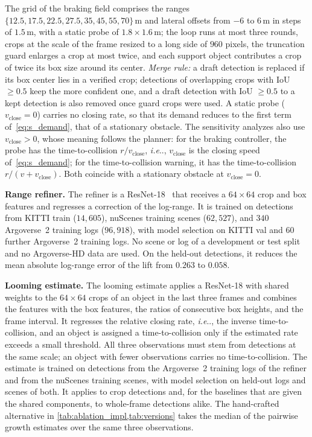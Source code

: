 \documentclass[10pt,letterpaper]{article}
\makeatletter
\DeclareRobustCommand\onedot{\futurelet\@let@token\@onedot}
\def\@onedot{\ifx\@let@token.\else.\null\fi\xspace}
\def\ie{\emph{i.e}\onedot} \def\Ie{\emph{I.e}\onedot}
\newcommand{\vclose}{v_{\mathrm{close}}}
\theoremstyle{remark}
\theoremstyle{plain}
\theoremstyle{definition}
\makeatother
\begin{document}
The grid of the braking field comprises the ranges $\{12.5, 17.5, 22.5, 27.5, 35, 45, 55, 70\}$\,m and lateral offsets from $-6$ to $6$\,m in steps of $1.5$\,m, with a static probe of $1.8\times1.6$\,m; the loop runs at most three rounds, crops at the scale of the frame resized to a long side of $960$ pixels, the truncation guard enlarges a crop at most twice, and each support object contributes a crop of twice its box size around its center.
\emph{Merge rule:} a draft detection is replaced if its box center lies in a verified crop; detections of overlapping crops with IoU $\ge0.5$ keep the more confident one, and a draft detection with IoU $\ge0.5$ to a kept detection is also removed once guard crops were used.
A static probe ($\vclose=0$) carries no closing rate, so that its demand reduces to the first term of~\cref{eq:s_demand}, that of a stationary obstacle.
The sensitivity analyzes also use $\vclose>0$, whose meaning follows the planner: for the braking controller, the probe has the time-to-collision $r/\vclose$, \ie, $\vclose$ is the closing speed of~\cref{eq:s_demand}; for the time-to-collision warning, it has the time-to-collision $r/(v+\vclose)$. Both coincide with a stationary obstacle at $\vclose=0$.

\noindent\textbf{Range refiner.}
The refiner is a ResNet-18~\cite{resnet} that receives a $64\times64$ crop and box features and regresses a correction of the log-range.
It is trained on detections from KITTI train ($14{,}605$), nuScenes training scenes ($62{,}527$), and $340$ Argoverse~2 training logs ($96{,}918$), with model selection on KITTI val and $60$ further Argoverse~2 training logs.
No scene or log of a development or test split and no Argoverse-HD data are used.
On the held-out detections, it reduces the mean absolute log-range error of the lift from $0.263$ to $0.058$.

\noindent\textbf{Looming estimate.}
The looming estimate applies a ResNet-18 with shared weights to the $64\times64$ crops of an object in the last three frames and combines the features with the box features, the ratios of consecutive box heights, and the frame interval.
It regresses the relative closing rate, \ie, the inverse time-to-collision, and an object is assigned a time-to-collision only if the estimated rate exceeds a small threshold.
All three observations must stem from detections at the same scale; an object with fewer observations carries no time-to-collision.
The estimate is trained on detections from the Argoverse~2 training logs of the refiner and from the nuScenes training scenes, with model selection on held-out logs and scenes of both.
It applies to crop detections and, for the baselines that are given the shared components, to whole-frame detections alike.
The hand-crafted alternative in \cref{tab:ablation_impl,tab:versions} takes the median of the pairwise growth estimates over the same three observations.
\end{document}
